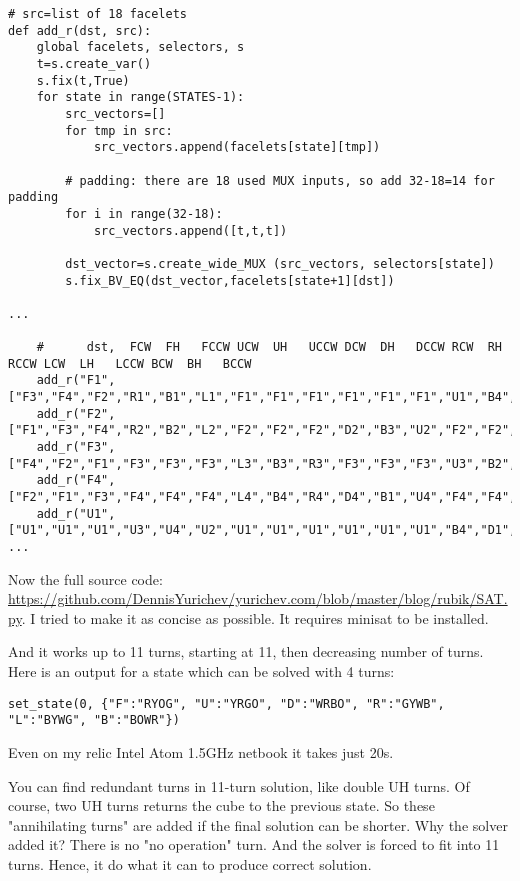\begin{lstlisting}
# src=list of 18 facelets
def add_r(dst, src):
    global facelets, selectors, s
    t=s.create_var()
    s.fix(t,True)
    for state in range(STATES-1):
        src_vectors=[]
        for tmp in src:
            src_vectors.append(facelets[state][tmp])

        # padding: there are 18 used MUX inputs, so add 32-18=14 for padding
        for i in range(32-18): 
            src_vectors.append([t,t,t])

        dst_vector=s.create_wide_MUX (src_vectors, selectors[state])
        s.fix_BV_EQ(dst_vector,facelets[state+1][dst])

...

    #      dst,  FCW  FH   FCCW UCW  UH   UCCW DCW  DH   DCCW RCW  RH   RCCW LCW  LH   LCCW BCW  BH   BCCW
    add_r("F1",["F3","F4","F2","R1","B1","L1","F1","F1","F1","F1","F1","F1","U1","B4","D1","F1","F1","F1"])
    add_r("F2",["F1","F3","F4","R2","B2","L2","F2","F2","F2","D2","B3","U2","F2","F2","F2","F2","F2","F2"])
    add_r("F3",["F4","F2","F1","F3","F3","F3","L3","B3","R3","F3","F3","F3","U3","B2","D3","F3","F3","F3"])
    add_r("F4",["F2","F1","F3","F4","F4","F4","L4","B4","R4","D4","B1","U4","F4","F4","F4","F4","F4","F4"])
    add_r("U1",["U1","U1","U1","U3","U4","U2","U1","U1","U1","U1","U1","U1","B4","D1","F1","R2","D4","L3"])
...
\end{lstlisting}

Now the full source code: \url{https://github.com/DennisYurichev/yurichev.com/blob/master/blog/rubik/SAT.py}.
I tried to make it as concise as possible.
It requires minisat to be installed.

And it works up to 11 turns, starting at 11, then decreasing number of turns.
Here is an output for a state which can be solved with 4 turns:

\begin{lstlisting}
set_state(0, {"F":"RYOG", "U":"YRGO", "D":"WRBO", "R":"GYWB", "L":"BYWG", "B":"BOWR"})
\end{lstlisting}



Even on my relic Intel Atom 1.5GHz netbook it takes just 20s.

You can find redundant turns in 11-turn solution, like double UH turns.
Of course, two UH turns returns the cube to the previous state.
So these "annihilating turns" are added if the final solution can be shorter.
Why the solver added it? There is no "no operation" turn. And the solver is forced to fit into 11 turns.
Hence, it do what it can to produce correct solution.

